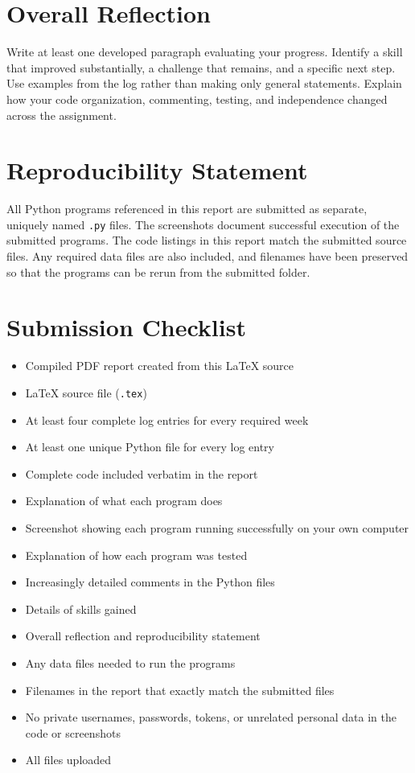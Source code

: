 \documentclass[12pt]{article}
\begin{document}
\section{Overall Reflection}
Write at least one developed paragraph evaluating your progress. Identify a skill that improved substantially, a challenge that remains, and a specific next step. Use examples from the log rather than making only general statements. Explain how your code organization, commenting, testing, and independence changed across the assignment.

\section{Reproducibility Statement}
All Python programs referenced in this report are submitted as separate, uniquely named \texttt{.py} files. The screenshots document successful execution of the submitted programs. The code listings in this report match the submitted source files. Any required data files are also included, and filenames have been preserved so that the programs can be rerun from the submitted folder.

\section{Submission Checklist}
\begin{itemize}
  \item Compiled PDF report created from this LaTeX source
  \item LaTeX source file (\texttt{.tex})
  \item At least four complete log entries for every required week
  \item At least one unique Python file for every log entry
  \item Complete code included verbatim in the report
  \item Explanation of what each program does
  \item Screenshot showing each program running successfully on your own computer
  \item Explanation of how each program was tested
  \item Increasingly detailed comments in the Python files
  \item Details of skills gained
  \item Overall reflection and reproducibility statement
  \item Any data files needed to run the programs
  \item Filenames in the report that exactly match the submitted files
  \item No private usernames, passwords, tokens, or unrelated personal data in the code or screenshots
  \item All files uploaded
\end{itemize}
\end{document}
